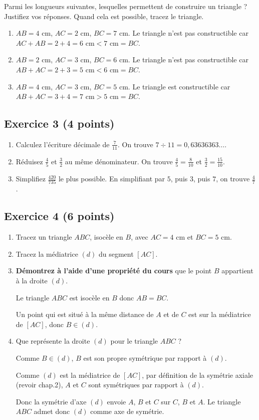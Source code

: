 \documentclass[14 pt]{extarticle}
\theoremstyle{plain}
\begin{document}
Parmi les longueurs suivantes, lesquelles permettent de construire un triangle ? Justifiez vos réponses. Quand cela est possible, tracez le triangle.
\begin{enumerate}
\item $AB = 4$ cm, $AC = 2$ cm, $BC = 7$ cm. {\color{red}Le triangle n'est pas constructible car $AC + AB = 2 + 4 = 6 \text{ cm} < 7 \text{ cm} = BC$.}
\item $AB = 2$ cm, $AC = 3$ cm, $BC = 6$ cm. {\color{red}Le triangle n'est pas constructible car $AB + AC = 2 + 3 = 5 \text{ cm} < 6 \text{ cm} = BC$.}
\item $AB = 4$ cm, $AC = 3$ cm, $BC = 5$ cm. {\color{red}Le triangle est constructible car $AB + AC = 3 + 4 = 7 \text{ cm} > 5 \text{ cm} = BC$.}
\end{enumerate}


\subsection*{Exercice 3 (4 points)}
\begin{enumerate}
\item Calculez l'écriture décimale de $\frac7{11}$. {\color{red} On trouve $7\div 11 = 0,63636363\ldots$}.
\item Réduisez $\frac45$ et $\frac32$ au même dénominateur. 
{\color{red} On trouve $\frac45 = \frac8{10}$ et $\frac32 = \frac{15}{10}$.}
\item Simplifiez $\frac{420}{735}$ le plus possible. 
{\color{red} En simplifiant par $5$, puis $3$, puis $7$, on trouve $\frac{4}{7}$.}
\end{enumerate}


\subsection*{Exercice 4 (6 points)}
\begin{enumerate}
\item Tracez un triangle $ABC$, isocèle en $B$, avec $AC = 4$ cm et $BC = 5$ cm. 
\item Tracez la médiatrice $(d)$ du segment $[AC]$. 
\item \textbf{Démontrez à l'aide d'une propriété du cours} que le point $B$ appartient à la droite $(d)$. {\color{red} Le triangle $ABC$ est isocèle en $B$ donc $AB=BC$. 

Un point qui est situé à la même distance de $A$ et de $C$ est sur la médiatrice de $[AC]$, donc $B\in (d)$. }
\item Que représente la droite $(d)$ pour le triangle $ABC$ ?
{\color{red} Comme $B\in(d)$, $B$ est son propre symétrique par rapport à $(d)$. 

Comme $(d)$ est la médiatrice de $[AC]$, par définition de la symétrie axiale (revoir chap.2), $A$ et $C$ sont symétriques par rapport à $(d)$. 

Donc la symétrie d'axe $(d)$ envoie $A$, $B$ et $C$ sur $C$, $B$ et $A$. Le triangle $ABC$ admet donc $(d)$ comme axe de symétrie. }
\end{enumerate}


 	
\end{document}
